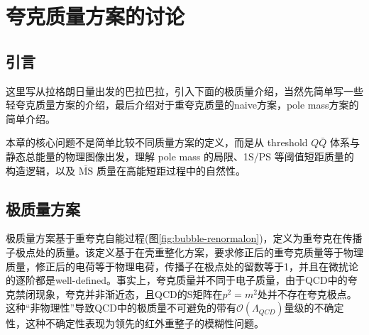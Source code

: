 \chapter{夸克质量方案的讨论}
\label{chap:mass_scheme}
\section{引言}
这里写从拉格朗日量出发的巴拉巴拉，引入下面的极质量介绍，当然先简单写一些轻夸克质量方案的介绍，最后介绍对于重夸克质量的naive方案，pole mass方案的简单介绍。

本章的核心问题不是简单比较不同质量方案的定义，而是从 threshold $Q\bar Q$ 体系与静态总能量的物理图像出发，理解 pole mass 的局限、1S/PS 等阈值短距质量的构造逻辑，以及 $\overline{\mathrm{MS}}$ 质量在高能短距过程中的自然性。

\section{极质量方案}
极质量方案基于重夸克自能过程(图\ref{fig:bubble-renormalon})，定义为重夸克在传播子极点处的质量。该定义基于在壳重整化方案，要求修正后的重夸克质量等于物理质量，修正后的电荷等于物理电荷，传播子在极点处的留数等于1，并且在微扰论的逐阶都是well-defined。事实上，夸克质量并不同于电子质量，由于QCD中的夸克禁闭现象，夸克并非渐近态，且QCD的S矩阵在$p^2=m^2$处并不存在夸克极点。这种“非物理性”导致QCD中的极质量不可避免的带有$\mathcal{O}(\Lambda_{QCD})$量级的不确定性，这种不确定性表现为领先的红外重整子的模糊性问题。

